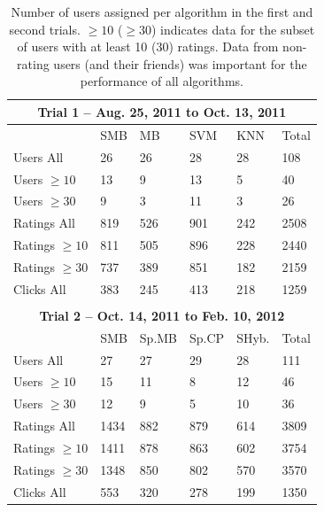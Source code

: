 \begin{table}[t!]
\centering \footnotesize
\begin{tabular}{|l|l|l|l|l|l|}
\multicolumn{6}{c}{\bf Trial 1 -- Aug. 25, 2011 to Oct. 13, 2011 } \\ \hline 
 & {\rm SMB} & {\rm MB} & {\rm SVM} & {\rm KNN} & {\rm Total}\\ \hline 
{\rm Users All}          & 26  & 26  & 28  & 28  & 108  \\ 
{\rm Users $\geq 10$}    & 13  & 9   & 13  & 5   & 40   \\ 
{\rm Users $\geq 30$}    &  9  & 3   & 11  & 3   & 26   \\ \hline 
{\rm Ratings All}        & 819 & 526 & 901 & 242 & 2508 \\ 
{\rm Ratings $\geq 10$}  & 811 & 505 & 896 & 228 & 2440 \\ 
{\rm Ratings $\geq 30$}  & 737 & 389 & 851 & 182 & 2159 \\ \hline %
{\rm Clicks All}   & 383 & 245 & 413 & 218 & 1259 \\ \hline 
\multicolumn{6}{c}{} \\  
\multicolumn{6}{c}{\bf Trial 2 -- Oct. 14, 2011 to Feb. 10, 2012} \\ \hline 
 & {\rm SMB} & {\rm Sp.MB} & {\rm Sp.CP} & {\rm SHyb.} & {\rm Total}\\ \hline 
{\rm Users All}          & 27   & 27  & 29  & 28  & 111  \\ 
{\rm Users $\geq 10$}    & 15   & 11  & 8   & 12  & 46   \\ 
{\rm Users $\geq 30$}    & 12   & 9   & 5   & 10  & 36   \\ \hline 
{\rm Ratings All}        & 1434 & 882 & 879 & 614 & 3809 \\  
{\rm Ratings $\geq 10$}  & 1411 & 878 & 863 & 602 & 3754 \\ 
{\rm Ratings $\geq 30$}  & 1348 & 850 & 802 & 570 & 3570 \\ \hline %
{\rm Clicks All}         & 553  & 320 & 278 & 199 & 1350 \\ \hline 
\end{tabular}
\caption{\footnotesize
Number of users assigned per algorithm in the first and
second trials.  $\geq 10$ ($\geq 30$) indicates data for
the subset of users with at least 10 (30) ratings.  Data
from non-rating users (and their friends) was important for
the performance of all algorithms.}
\vspace{-2mm}
\label{tab:Assigned1}
\end{table}

